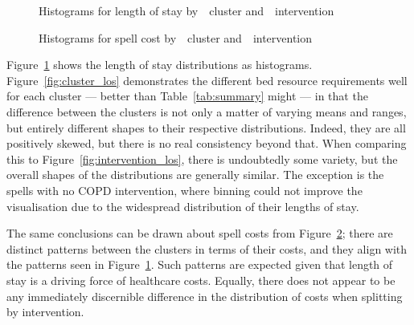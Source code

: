 \documentclass[]{interact}
\newlength{\imgwidth}
\theoremstyle{plain}%
\theoremstyle{definition}
\theoremstyle{remark}
\begin{document}
\begin{figure}
    \centering

    \caption{%
        Histograms for length of stay by~~cluster
        and~~intervention
    }
    \label{fig:los}
\end{figure}

\begin{figure}
    \centering

    \caption{%
        Histograms for spell cost by~~cluster
        and~~intervention
    }
    \label{fig:cost}
\end{figure}

Figure~\ref{fig:los} shows the length of stay distributions as histograms.
Figure~\ref{fig:cluster_los} demonstrates the different bed resource
requirements well for each cluster --- better than Table~\ref{tab:summary} might
--- in that the difference between the clusters is not only a matter of varying
means and ranges, but entirely different shapes to their respective
distributions. Indeed, they are all positively skewed, but there is no real
consistency beyond that. When comparing this to
Figure~\ref{fig:intervention_los}, there is undoubtedly some variety, but the
overall shapes of the distributions are generally similar. The exception is the
spells with no COPD intervention, where binning could not improve the
visualisation due to the widespread distribution of their lengths of stay.

The same conclusions can be drawn about spell costs from Figure~\ref{fig:cost};
there are distinct patterns between the clusters in terms of their costs, and
they align with the patterns seen in Figure~\ref{fig:los}. Such patterns are
expected given that length of stay is a driving force of healthcare costs.
Equally, there does not appear to be any immediately discernible difference in
the distribution of costs when splitting by intervention.
\end{document}
